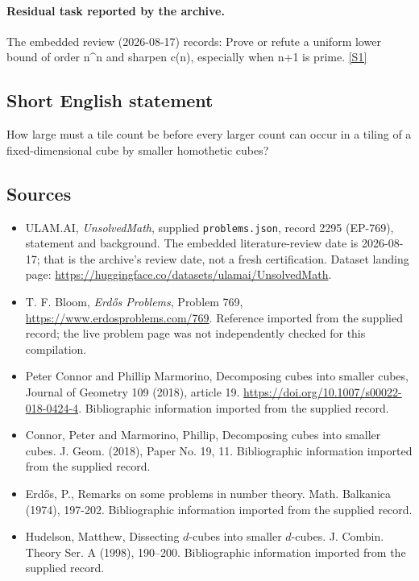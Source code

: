 \documentclass[11pt,a4paper]{article}
\newcommand{\sref}[2]{\hyperlink{source:#1:#2}{[S#2]}}
\begin{document}
\paragraph{Residual task reported by the archive.}

The embedded review (2026-08-17) records: Prove or refute a uniform lower bound of order n\textasciicircum{}n and sharpen c(n), especially when n+1 is prime. \sref{2295}{1}

\subsection{Short English statement}

How large must a tile count be before every larger count can occur in a tiling of a fixed-dimensional cube by smaller homothetic cubes?

\subsection{Sources}

{\small

\begin{itemize}

\item[\hypertarget{source:2295:1}{S1}] ULAM.AI, \emph{UnsolvedMath}, supplied \texttt{problems.json}, record 2295 (EP-769), statement and background. The embedded literature-review date is 2026-08-17; that is the archive’s review date, not a fresh certification. Dataset landing page: \url{https://huggingface.co/datasets/ulamai/UnsolvedMath}.

\item[\hypertarget{source:2295:2}{S2}] T. F. Bloom, \emph{Erdős Problems}, Problem 769, \url{https://www.erdosproblems.com/769}. Reference imported from the supplied record; the live problem page was not independently checked for this compilation.

\item[\hypertarget{source:2295:3}{S3}] Peter Connor and Phillip Marmorino, Decomposing cubes into smaller cubes, Journal of Geometry 109 (2018), article 19. \url{https://doi.org/10.1007/s00022-018-0424-4}. Bibliographic information imported from the supplied record.

\item[\hypertarget{source:2295:4}{S4}] Connor, Peter and Marmorino, Phillip, Decomposing cubes into smaller cubes. J. Geom. (2018), Paper No. 19, 11. Bibliographic information imported from the supplied record.

\item[\hypertarget{source:2295:5}{S5}] Erd\H{o}s, P., Remarks on some problems in number theory. Math. Balkanica (1974), 197-202. Bibliographic information imported from the supplied record.

\item[\hypertarget{source:2295:6}{S6}] Hudelson, Matthew, Dissecting {$d$}-cubes into smaller {$d$}-cubes. J. Combin. Theory Ser. A (1998), 190--200. Bibliographic information imported from the supplied record.

\end{itemize}

}

\label{end:2295}
\end{document}
